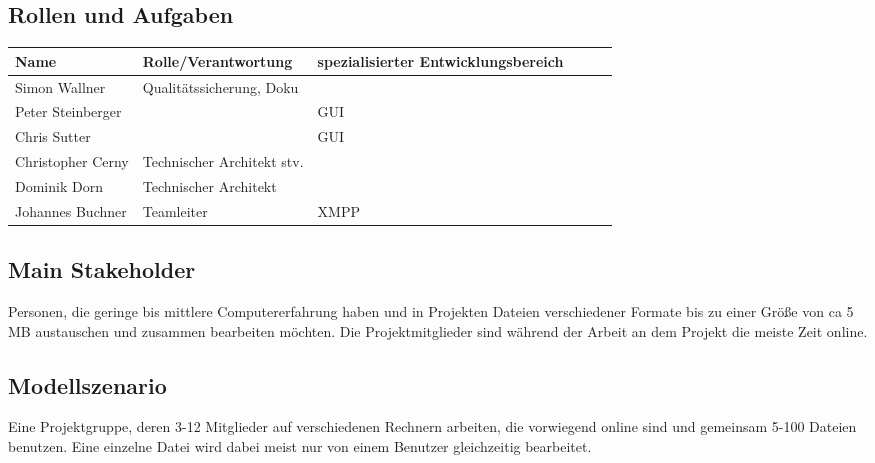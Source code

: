 \subsection{Rollen und Aufgaben}
\begin{tabular}{ | l | l | p{5.5cm} | p{1.7cm} | l | l |}
\hline
\textbf{Name} & \textbf{Rolle/Verantwortung} & \textbf{spezialisierter Entwicklungsbereich} \\
\hline
Simon Wallner & Qualitätssicherung, Doku & \\
\hline
Peter Steinberger &  & GUI \\
\hline
Chris Sutter &  & GUI \\
\hline
Christopher Cerny & Technischer Architekt stv. & \\
\hline
Dominik Dorn & Technischer Architekt & \\
\hline
Johannes Buchner & Teamleiter & XMPP \\
\hline
\end{tabular}

\subsection{Main Stakeholder}
Personen, die geringe bis mittlere Computererfahrung haben und in Projekten Dateien verschiedener Formate bis zu einer Größe von ca 5 MB austauschen und zusammen bearbeiten möchten. Die Projektmitglieder sind während der Arbeit an dem Projekt die meiste Zeit online.
\subsection{Modellszenario}

Eine Projektgruppe, deren 3-12 Mitglieder auf verschiedenen Rechnern arbeiten, die vorwiegend online sind und gemeinsam 5-100 Dateien benutzen. Eine einzelne Datei wird dabei meist nur von einem Benutzer gleichzeitig bearbeitet.
